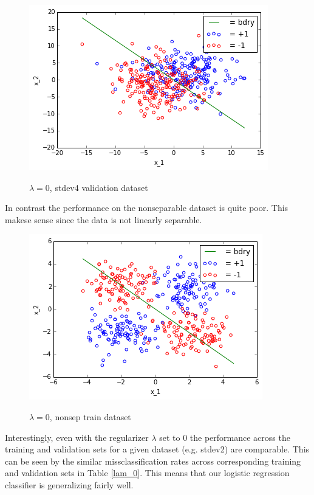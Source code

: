 \documentclass[10pt]{article}
\begin{document}
\begin{figure}
 \centering
 \includegraphics[scale=0.5]{stdev4_val_lam_0.png}
 \label{stdev4_val_lam_0}
 \caption{$\lambda = 0$, stdev4 validation dataset}
 \end{figure}
 In contrast the performance on the nonseparable dataset is quite poor. This makese sense since the data is not linearly separable.
\begin{figure}
 \centering
 \includegraphics[scale=0.5]{nonsep_train_lam_0.png}
 \label{nonsep_train_lam_0}
 \caption{$\lambda = 0$, nonsep train dataset}
 \end{figure}

 Interestingly, even with the regularizer $\lambda$ set to $0$ the performance across the training and validation sets for a given dataset (e.g. stdev2) are comparable. This can be seen by the similar missclassification rates across corresponding training and validation sets in Table \ref{lam_0}. This means that our logistic regression classifier is generalizing fairly well.
\end{document}
